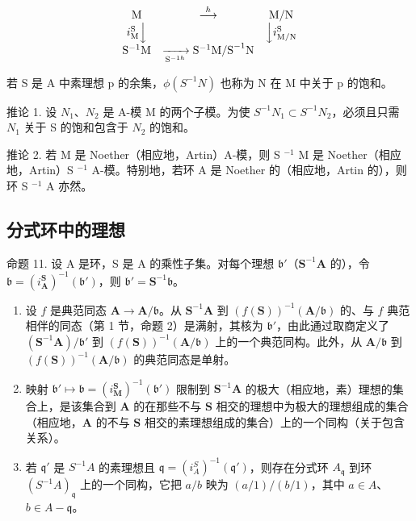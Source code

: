 \[
\begin{array}{c c c} \mathrm{M} & \stackrel {{h}} {{\longrightarrow}} & \mathrm{M/N} \\ i _ {\mathrm{M}} ^ {\mathrm{S}} \Big \downarrow & & \Big \downarrow i _ {\mathrm{M/N}} ^ {\mathrm{S}} \\ \mathrm{S} ^ {- 1} \mathrm{M} & \xrightarrow [ \mathrm{S} ^ {- 1 h} ]{} \mathrm{S} ^ {- 1} \mathrm{M/S} ^ {- 1} \mathrm{N} \end{array}
\]

若 S 是 A 中素理想 p 的余集，\(\phi(S^{-1}N)\) 也称为 N 在 M 中关于 p 的饱和。

推论 1. 设 \(N_{1}\)、\(N_{2}\) 是 A-模 M 的两个子模。为使 \(S^{-1}N_{1} \subset S^{-1}N_{2}\)，必须且只需 \(N_{1}\) 关于 S 的饱和包含于 \(N_{2}\) 的饱和。

推论 2. 若 M 是 Noether（相应地，Artin）A-模，则 S \(^{-1}\) M 是 Noether（相应地，Artin）S \(^{-1}\) A-模。特别地，若环 A 是 Noether 的（相应地，Artin 的），则环 S \(^{-1}\) A 亦然。

\subsection{分式环中的理想}

命题 11. 设 A 是环，S 是 A 的乘性子集。对每个理想 \(\mathfrak{b}'\)（\(\mathbf{S}^{-1}\mathbf{A}\) 的），令 \(\mathfrak{b} = (i_{\mathbf{A}}^{\mathbf{S}})^{-1}(\mathfrak{b}')\)，则 \(\mathfrak{b}' = \mathbf{S}^{-1}\mathfrak{b}\)。

\begin{enumerate}
\def\labelenumi{(\roman{enumi})}
\item
  设 \(f\) 是典范同态 \(\mathbf{A} \to \mathbf{A} / \mathfrak{b}\)。从 \(\mathbf{S}^{-1}\mathbf{A}\) 到 \((f(\mathbf{S}))^{-1}(\mathbf{A} / \mathfrak{b})\) 的、与 \(f\) 典范相伴的同态（第 1 节，命题 2）是满射，其核为 \(\mathfrak{b}'\)，由此通过取商定义了 \((\mathbf{S}^{-1}\mathbf{A}) / \mathfrak{b}'\) 到 \((f(\mathbf{S}))^{-1}(\mathbf{A} / \mathfrak{b})\) 上的一个典范同构。此外，从 \(\mathbf{A} / \mathfrak{b}\) 到 \((f(\mathbf{S}))^{-1}(\mathbf{A} / \mathfrak{b})\) 的典范同态是单射。
\item
  映射 \(\mathfrak{b}' \mapsto \mathfrak{b} = (i_{\mathbf{M}}^{\mathbf{S}})^{-1}(\mathfrak{b}')\) 限制到 \(\mathbf{S}^{-1}\mathbf{A}\) 的极大（相应地，素）理想的集合上，是该集合到 \(\mathbf{A}\) 的在那些不与 \(\mathbf{S}\) 相交的理想中为极大的理想组成的集合（相应地，\(\mathbf{A}\) 的不与 \(\mathbf{S}\) 相交的素理想组成的集合）上的一个同构（关于包含关系）。
\item
  若 \(\mathfrak{q}'\) 是 \(S^{-1}A\) 的素理想且 \(\mathfrak{q} = (i_A^S)^{-1}(\mathfrak{q}')\)，则存在分式环 \(A_{\mathfrak{q}}\) 到环 \((S^{-1}A)_{\mathfrak{q}}\) 上的一个同构，它把 \(a/b\) 映为 \((a/1)/(b/1)\)，其中 \(a \in A\)、\(b \in A - \mathfrak{q}\)。

\end{enumerate}

